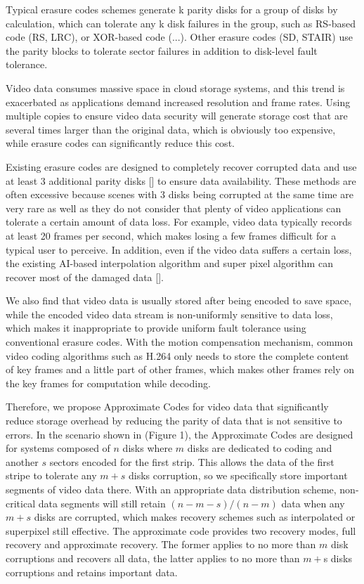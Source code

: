 \documentclass[conference]{IEEEtran}
\begin{document}
Typical erasure codes schemes generate k parity disks for a group of disks by calculation, which can tolerate any k disk failures in the group, such as RS-based code (RS, LRC), or XOR-based code (...). Other erasure codes (SD, STAIR) use the parity blocks to tolerate sector failures in addition to disk-level fault tolerance.

Video data consumes massive space in cloud storage systems, and this trend is exacerbated as applications demand increased resolution and frame rates. Using multiple copies to ensure video data security will generate storage cost that are several times larger than the original data, which is obviously too expensive, while erasure codes can significantly reduce this cost.

Existing erasure codes are designed to completely recover corrupted data and use at least 3 additional parity disks [] to ensure data availability. These methods are often excessive because scenes with 3 disks being corrupted at the same time are very rare as well as they do not consider that plenty of video applications can tolerate a certain amount of data loss. For example, video data typically records at least 20 frames per second, which makes losing a few frames difficult for a typical user to perceive. In addition, even if the video data suffers a certain loss, the existing AI-based interpolation algorithm and super pixel algorithm can recover most of the damaged data [].

We also find that video data is usually stored after being encoded to save space, while the encoded video data stream is non-uniformly sensitive to data loss, which makes it inappropriate to provide uniform fault tolerance using conventional erasure codes. With the motion compensation mechanism, common video coding algorithms such as H.264 only needs to store the complete content of key frames and a little part of other frames, which makes other frames rely on the key frames for computation while decoding.

Therefore, we propose Approximate Codes for video data that significantly reduce storage overhead by reducing the parity of data that is not sensitive to errors. In the scenario shown in (Figure 1), the Approximate Codes are designed for systems composed of $n$ disks where $m$ disks are dedicated to coding and another $s$ sectors encoded for the first strip. This allows the data of the first stripe to tolerate any $m+s$ disks corruption, so we specifically store important segments of video data there. With an appropriate data distribution scheme, non-critical data segments will still retain $(n-m-s)/(n-m)$ data when any $m+s$ disks are corrupted, which makes recovery schemes such as interpolated or superpixel still effective. The approximate code provides two recovery modes, full recovery and approximate recovery. The former applies to no more than $m$ disk corruptions and recovers all data, the latter applies to no more than $m+$s disks corruptions and retains important data.
\end{document}
